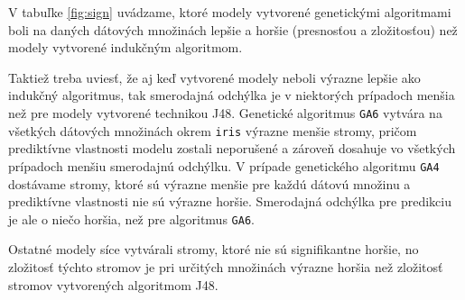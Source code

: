 V tabuľke \ref{fig:sign} uvádzame, ktoré modely vytvorené genetickými algoritmami boli na daných dátových množinách lepšie a horšie (presnosťou a zložitosťou) než modely vytvorené indukčným algoritmom.

Taktiež treba uviesť, že aj keď vytvorené modely neboli výrazne lepšie ako indukčný algoritmus, tak smerodajná odchýlka je v niektorých prípadoch menšia než pre modely vytvorené technikou J48.
Genetické algoritmus \verb|GA6| vytvára na všetkých dátových množinách okrem \verb|iris| výrazne menšie stromy, pričom prediktívne vlastnosti modelu zostali neporušené a zároveň dosahuje vo všetkých prípadoch menšiu smerodajnú odchýlku. V prípade genetického algoritmu \verb|GA4| dostávame stromy, ktoré sú výrazne menšie pre každú dátovú množinu a prediktívne vlastnosti nie sú výrazne horšie. Smerodajná odchýlka pre predikciu je ale o niečo horšia, než pre algoritmus \verb|GA6|.

Ostatné modely síce vytvárali stromy, ktoré nie sú signifikantne horšie, no zložitosť týchto stromov je pri určitých množinách výrazne horšia než zložitosť stromov vytvorených algoritmom J48.

